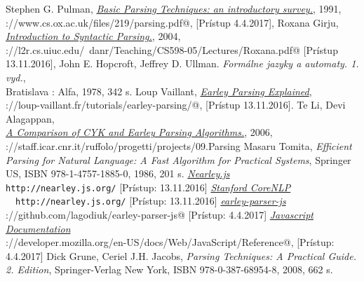 \documentclass[12pt,a4paper]{report}
\theoremstyle{definition}
\theoremstyle{remark}
\begin{document}
\renewcommand\bibname{Literatúra}
\begin{thebibliography}{99}
Stephen G. Pulman, \emph{\href{https://www.cs.ox.ac.uk/files/219/parsing.pdf}{Basic Parsing Techniques: an introductory survey.}}, 1991, \\ \verb@https://www.cs.ox.ac.uk/files/219/parsing.pdf@, [Prístup 4.4.2017],
Roxana Girju, \emph{\href{http://l2r.cs.uiuc.edu/~danr/Teaching/CS598-05/Lectures/Roxana.pdf}{Introduction to Syntactic Parsing.}}, 2004, \\ \verb@http://l2r.cs.uiuc.edu/~danr/Teaching/CS598-05/Lectures/Roxana.pdf@ [Prístup 13.11.2016],
John E. Hopcroft, Jeffrey D. Ullman. \emph{Formálne jazyky a automaty. 1. vyd.}, \\ Bratislava : Alfa, 1978, 342 s.
Loup Vaillant, \emph{\href{http://loup-vaillant.fr/tutorials/earley-parsing/}{Earley Parsing Explained}}, \\ \verb@http://loup-vaillant.fr/tutorials/earley-parsing/@, [Prístup 13.11.2016].
Te Li, Devi Alagappan, \\
\emph{\href{http://staff.icar.cnr.it/ruffolo/progetti/projects/09.Parsing\%20CYK/A\%20Comparison\%20of\%20CYK\%20and\%20Earley\%20Parsing\%20Algorithms-cykeReport.pdf}{A Comparison of CYK and Earley Parsing Algorithms.}}, 2006, \\ \verb@http://staff.icar.cnr.it/ruffolo/progetti/projects/09.Parsing\@
\verb@%20CYK/A\%20Comparison\%20of\%20CYK\%20and\%20Earley\%20Parsing\@
\verb@%20Algorithms-cykeReport.pdf@ [Prístup 18.11.2016],
Masaru Tomita, \emph{Efficient Parsing for Natural Language: A Fast Algorithm for Practical Systems}, Springer US, ISBN 978-1-4757-1885-0, 1986, 201 s.
\emph{\href{http://nearley.js.org/}{Nearley.js}} \\ \verb!http://nearley.js.org/! [Prístup: 13.11.2016]
\emph{\href{https://stanfordnlp.github.io/CoreNLP/}{Stanford CoreNLP}} \ \ \verb!http://nearley.js.org/! [Prístup: 13.11.2016]
\emph{\href{https://github.com/lagodiuk/earley-parser-js}{earley-parser-js}}  \\
\verb@https://github.com/lagodiuk/earley-parser-js@ [Prístup: 4.4.2017]
\emph{\href{https://developer.mozilla.org/en-US/docs/Web/JavaScript/Reference}{Javascript Documentation}} \\ \verb@https://developer.mozilla.org/en-US/docs/Web/JavaScript/Reference@, [Prístup: 4.4.2017]
Dick Grune, Ceriel J.H. Jacobs, \emph{Parsing Techniques: A Practical Guide. 2. Edition}, Springer-Verlag New York,  ISBN 978-0-387-68954-8, 2008, 662 s.
\end{thebibliography}
\end{document}
